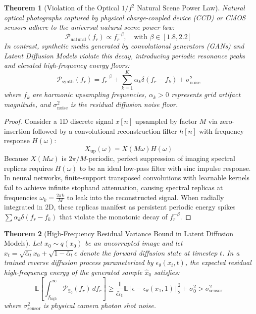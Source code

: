 \documentclass[journal]{IEEEtran}
\newtheorem{theorem}{Theorem}
\begin{document}
\begin{theorem}[Violation of the Optical $1/f^2$ Natural Scene Power Law]
Natural optical photographs captured by physical charge-coupled device (CCD) or CMOS sensors adhere to the universal natural scene power law:
\begin{equation}
\mathcal{P}_{\text{natural}}(f_r) \propto f_r^{-\beta}, \quad \text{with } \beta \in [1.8, 2.2]
\end{equation}
In contrast, synthetic media generated by convolutional generators (GANs) and Latent Diffusion Models violate this decay, introducing periodic resonance peaks and elevated high-frequency energy floors:
\begin{equation}
\mathcal{P}_{\text{synth}}(f_r) = f_r^{-\beta} + \sum_{k=1}^K \alpha_k \delta(f_r - f_k) + \sigma_{\text{noise}}^2
\end{equation}
where $f_k$ are harmonic upsampling frequencies, $\alpha_k > 0$ represents grid artifact magnitude, and $\sigma_{\text{noise}}^2$ is the residual diffusion noise floor.
\end{theorem}

\begin{proof}
Consider a 1D discrete signal $x[n]$ upsampled by factor $M$ via zero-insertion followed by a convolutional reconstruction filter $h[n]$ with frequency response $H(\omega)$:
\begin{equation}
X_{\text{up}}(\omega) = X(M\omega) H(\omega)
\end{equation}
Because $X(M\omega)$ is $2\pi/M$-periodic, perfect suppression of imaging spectral replicas requires $H(\omega)$ to be an ideal low-pass filter with sinc impulse response. In neural networks, finite-support transposed convolutions with learnable kernels fail to achieve infinite stopband attenuation, causing spectral replicas at frequencies $\omega_k = \frac{2\pi k}{M}$ to leak into the reconstructed signal. When radially integrated in 2D, these replicas manifest as persistent periodic energy spikes $\sum \alpha_k \delta(f_r - f_k)$ that violate the monotonic decay of $f_r^{-\beta}$.
\end{proof}

\begin{theorem}[High-Frequency Residual Variance Bound in Latent Diffusion Models]
Let $x_0 \sim q(x_0)$ be an uncorrupted image and let $x_t = \sqrt{\bar{\alpha}_t} x_0 + \sqrt{1 - \bar{\alpha}_t} \epsilon$ denote the forward diffusion state at timestep $t$. In a trained reverse diffusion process parameterized by $\epsilon_\theta(x_t, t)$, the expected residual high-frequency energy of the generated sample $\hat{x}_0$ satisfies:
\begin{equation}
\mathbb{E} \left[ \int_{f_{\text{high}}}^{\infty} \mathcal{P}_{\hat{x}_0}(f_r) \, df_r \right] \ge \frac{1}{\bar{\alpha}_1} \mathbb{E} ||\epsilon - \epsilon_\theta(x_1, 1)||_2^2 + \sigma_0^2 > \sigma_{\text{sensor}}^2
\end{equation}
where $\sigma_{\text{sensor}}^2$ is physical camera photon shot noise.
\end{theorem}
\end{document}
